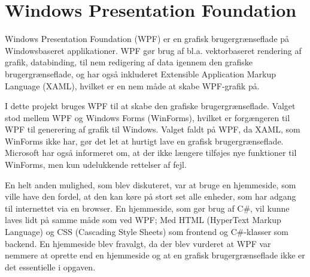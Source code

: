 \section{Windows Presentation Foundation}
Windows Presentation Foundation (WPF) er en grafisk brugergrænseflade på Windowsbaseret applikationer. 
WPF gør brug af  bl.a. vektorbaseret rendering af grafik, databinding, til nem redigering af data igennem den grafiske brugergrænseflade, og har også inkluderet Extensible Application Markup Language (XAML), hvilket er en nem måde at skabe WPF-grafik på.\citep{wpf} 

I dette projekt bruges WPF til at skabe den grafiske brugergrænseflade. Valget stod mellem WPF og Windows Forms (WinForms), hvilket er forgængeren til WPF til generering af grafik til Windows. 
Valget faldt på WPF, da XAML, som WinForms ikke har, gør det let at hurtigt lave en grafisk brugergrænseflade. 
Microsoft har også informeret om, at der ikke længere tilføjes nye funktioner til WinForms, men kun udelukkende rettelser af fejl.\citep{winforms}

En helt anden mulighed, som blev diskuteret, var at bruge en hjemmeside, som ville have den fordel, at den kan køre på stort set alle enheder, som har adgang til internettet via en browser. En hjemmeside, som gør brug af C\#, vil kunne laves lidt på samme måde som ved WPF; Med HTML (HyperText Markup Language) og CSS (Cascading Style Sheets) som frontend og C\#-klasser som backend. 
En hjemmeside blev fravalgt, da der blev vurderet at WPF var nemmere at oprette end en hjemmeside og at en grafisk brugergrænseflade ikke er det essentielle i opgaven. 

